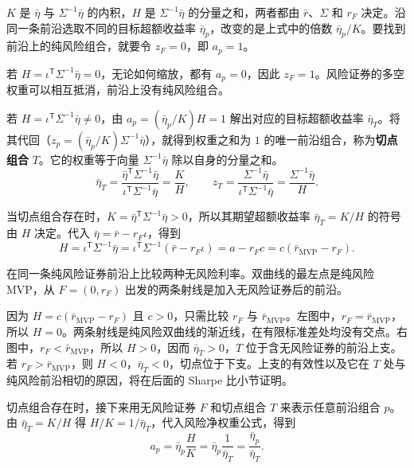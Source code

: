 $K$ 是 $\bar\eta$ 与 $\Sigma^{-1}\bar\eta$ 的内积，$H$ 是 $\Sigma^{-1}\bar\eta$ 的分量之和，两者都由 $\bar r$、$\Sigma$ 和 $r_F$ 决定。沿同一条前沿选取不同的目标超额收益率 $\bar\eta_p$，改变的是上式中的倍数 $\bar\eta_p/K$。要找到前沿上的纯风险组合，就要令 $z_F=0$，即 $a_p=1$。

若 $H=\iota^{\mathsf T}\Sigma^{-1}\bar\eta=0$，无论如何缩放，都有 $a_p=0$，因此 $z_F=1$。风险证券的多空权重可以相互抵消，前沿上没有纯风险组合。

若 $H=\iota^{\mathsf T}\Sigma^{-1}\bar\eta\ne0$，由 $a_p=(\bar\eta_p/K)H=1$ 解出对应的目标超额收益率 $\bar\eta_T$。将其代回（$z_p=(\bar\eta_p/K)\Sigma^{-1}\bar\eta$），就得到权重之和为 $1$ 的唯一前沿组合，称为\hypertarget{wj-tangency-portfolio}{}\textbf{切点组合} $T$。它的权重等于向量 $\Sigma^{-1}\bar\eta$ 除以自身的分量之和。
\begin{equation*}
 \bar\eta_T=\frac{\bar\eta^{\mathsf T}\Sigma^{-1}\bar\eta}
                  {\iota^{\mathsf T}\Sigma^{-1}\bar\eta}=\frac{K}{H},
 \qquad z_T=\frac{\Sigma^{-1}\bar\eta}{\iota^{\mathsf T}\Sigma^{-1}\bar\eta}
            =\frac{\Sigma^{-1}\bar\eta}{H}.
 \tag{12.XII}\label{eq:wj-12-tangency-weights}
\end{equation*}

当切点组合存在时，$K=\bar\eta^{\mathsf T}\Sigma^{-1}\bar\eta>0$，所以其期望超额收益率 $\bar\eta_T=K/H$ 的符号由 $H$ 决定。代入 $\bar\eta=\bar r-r_F\iota$，得到
\begin{equation*}
 H=\iota^{\mathsf T}\Sigma^{-1}\bar\eta
 =\iota^{\mathsf T}\Sigma^{-1}(\bar r-r_F\iota)
 =a-r_Fc=c(\bar r_{\mathrm{MVP}}-r_F).
 \tag{12.XIII}\label{eq:wj-12-tangency-normalizer}
\end{equation*}

 在同一条纯风险证券前沿上比较两种无风险利率。双曲线的最左点是纯风险 MVP，从 $F=(0,r_F)$ 出发的两条射线是加入无风险证券后的前沿。

因为 $H=c(\bar r_{\mathrm{MVP}}-r_F)$ 且 $c>0$，只需比较 $r_F$ 与 $\bar r_{\mathrm{MVP}}$。左图中，$r_F=\bar r_{\mathrm{MVP}}$，所以 $H=0$。两条射线是纯风险双曲线的渐近线，在有限标准差处均没有交点。右图中，$r_F<\bar r_{\mathrm{MVP}}$，所以 $H>0$，因而 $\bar\eta_T>0$，$T$ 位于含无风险证券的前沿上支。若 $r_F>\bar r_{\mathrm{MVP}}$，则 $H<0$，$\bar\eta_T<0$，切点位于下支。上支的有效性以及它在 $T$ 处与纯风险前沿相切的原因，将在后面的 Sharpe 比小节证明。

切点组合存在时，接下来用无风险证券 $F$ 和切点组合 $T$ 来表示任意前沿组合 $p$。由 $\bar\eta_T=K/H$ 得 $H/K=1/\bar\eta_T$，代入风险净权重公式，得到
\[
 a_p=\bar\eta_p\frac{H}{K}
    =\bar\eta_p\frac{1}{\bar\eta_T}
    =\frac{\bar\eta_p}{\bar\eta_T}.
\]

